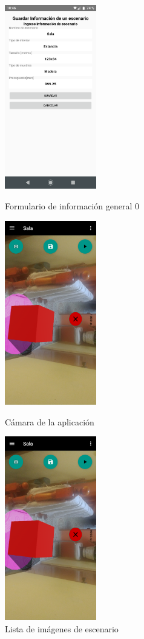 \begin{figure}[hbt!]
	\begin{minipage}{0.32\textwidth}
		\centering
		\includegraphics[width=4cm,height=8cm]{imagenes/desarrollo/app/presave_scenario.png}
		\caption{Formulario de información general   0}
		\label{fig:infosc}
	\end{minipage}\hfill
	\begin{minipage}{0.32\textwidth}
		\centering
		\includegraphics[width=4cm,height=8cm]{imagenes/desarrollo/app/camera01.png}
		\caption{Cámara de la aplicación}
		\label{fig:camera01}
	\end{minipage}\hfill
	\begin{minipage}{0.32\textwidth}
		\centering
		\includegraphics[width=4cm,height=8cm]{imagenes/desarrollo/app/camera01.png}
		\caption{Lista de imágenes de escenario}
		\label{fig:scimg}
	\end{minipage}\hfill
\end{figure}


